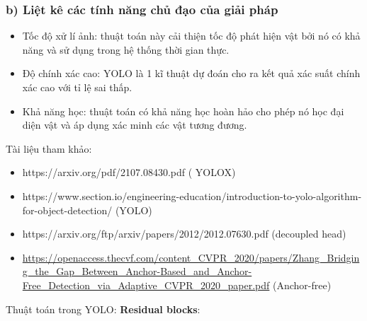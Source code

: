 \documentclass{article}
\begin{document}
	\subsubsection{b) Liệt kê các tính năng chủ đạo của giải pháp}
	\begin{itemize}
		\item Tốc độ xử lí ảnh: thuật toán này cải thiện tốc độ phát hiện vật bởi nó có khả năng và sử dụng trong hệ thống thời gian thực.
		\item Độ chính xác cao: YOLO là 1 kĩ thuật dự đoán cho ra kết quả xác suất chính xác cao với tỉ lệ sai thấp.
		\item Khả năng học: thuật toán có khả năng học hoàn hảo cho phép nó học đại diện vật và áp dụng xác minh các vật tương đương.
	\end{itemize}
	Tài liệu tham khảo:
	\begin{itemize}
		\item https://arxiv.org/pdf/2107.08430.pdf ( YOLOX)
		\item https://www.section.io/engineering-education/introduction-to-yolo-algorithm-for-object-detection/ (YOLO)
		\item https://arxiv.org/ftp/arxiv/papers/2012/2012.07630.pdf (decoupled head) 
		\item \href{https://openaccess.thecvf.com/content\_CVPR\_2020/papers/Zhang\_Bridging\_the\_Gap\_Between\_Anchor-Based\_and\_Anchor-Free\_Detection\_via\_Adaptive\_CVPR\_2020\_paper.pdf}{https://openaccess.thecvf.com/content\_CVPR\_2020/papers/Zhang\_Bridging\_the\_Gap\_Between\_Anchor-Based\_and\_Anchor-Free\_Detection\_via\_Adaptive\_CVPR\_2020\_paper.pdf} (Anchor-free)
	\end{itemize}
	Thuật toán trong YOLO: \newline
	\textbf{Residual blocks}:
\end{document}
